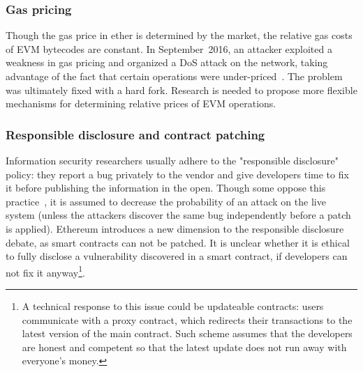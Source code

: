 \subsubsection*{Gas pricing}
Though the gas price in ether is determined by the market, the relative gas costs of EVM bytecodes are constant.
In September~2016, an attacker exploited a weakness in gas pricing and organized a DoS attack on the network, taking advantage of the fact that certain operations were under-priced~\cite{EIP150}.
The problem was ultimately fixed with a hard fork.
Research is needed to propose more flexible mechanisms for determining relative prices of EVM operations.

\subsubsection*{Responsible disclosure and contract patching}
Information security researchers usually adhere to the "responsible disclosure" policy: they report a bug privately to the vendor and give developers time to fix it before publishing the information in the open.
Though some oppose this practice~\cite{Schneier2007}, it is assumed to decrease the probability of an attack on the live system (unless the attackers discover the same bug independently before a patch is applied).
Ethereum introduces a new dimension to the responsible disclosure debate, as smart contracts can not be patched.
It is unclear whether it is ethical to fully disclose a vulnerability discovered in a smart contract, if developers can not fix it anyway\footnote{A technical response to this issue could be updateable contracts: users communicate with a proxy contract, which redirects their transactions to the latest version of the main contract. Such scheme assumes that the developers are honest and competent so that the latest update does not run away with everyone's money.}.
